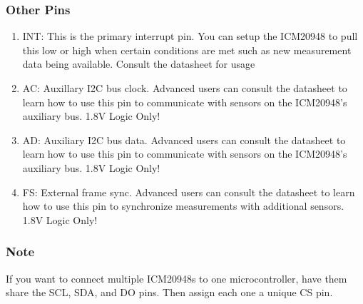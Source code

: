 \documentclass[11pt, oneside]{article}   	%
\begin{document}
\subsubsection{Other Pins}
\begin{enumerate}
\item INT: This is the primary interrupt pin. You can setup the ICM20948 to pull this low or high when certain conditions are met such as new measurement data being available. Consult the datasheet for usage
\item AC: Auxillary I2C bus clock. Advanced users can consult the datasheet to learn how to use this pin to communicate with sensors on the ICM20948's auxiliary bus. 1.8V Logic Only!
\item AD: Auxiliary I2C bus data. Advanced users can consult the datasheet to learn how to use this pin to communicate with sensors on the ICM20948's auxiliary bus. 1.8V Logic Only!
\item FS:  External frame sync. Advanced users can consult the datasheet to learn how to use this pin to synchronize measurements with additional sensors. 1.8V Logic Only!
\end{enumerate}

\subsubsection{Note}
If you want to connect multiple ICM20948s to one microcontroller, have them share the SCL, SDA, and DO pins. Then assign each one a unique CS pin.
\end{document}
